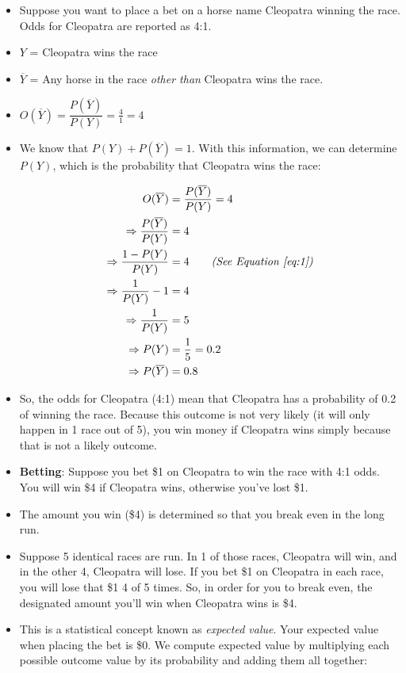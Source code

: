 \documentclass[]{book}
\providecommand{\tightlist}{%
  \setlength{\itemsep}{0pt}\setlength{\parskip}{0pt}}
\theoremstyle{definition}
\theoremstyle{definition}
\theoremstyle{remark}
\begin{document}
\begin{itemize}
\tightlist
\item
  Suppose you want to place a bet on a horse name Cleopatra winning the
  race. Odds for Cleopatra are reported as 4:1.
\item
  \(Y\) = Cleopatra wins the race
\item
  \(\overline{Y}\) = Any horse in the race \emph{other than} Cleopatra
  wins the race.
\item
  \(O(\overline{Y}) = \dfrac{P(\overline{Y})}{P(Y)} = \frac{4}{1} = 4\)
\item
  We know that \(P(Y) + P(\overline{Y})=1\). With this information, we
  can determine \(P(Y)\), which is the probability that Cleopatra wins
  the race:

  \begin{align*}
  O(\overline{Y}) & = \dfrac{P(\overline{Y})}{P(Y)} = 4 \\
  \Rightarrow  \dfrac{P(\overline{Y})}{P(Y)} & = 4 \\ \Rightarrow  \dfrac{1 - P(Y)}{P(Y)} & = 4 \quad \quad \textit{(See Equation \ref{eq:1})} \\ 
  \Rightarrow \dfrac{1}{P(Y)} - 1 & = 4 \\
  \Rightarrow \dfrac{1}{P(Y)} & = 5 \\
  \Rightarrow P(Y) & = \frac{1}{5} = 0.2 \\
  \Rightarrow P(\overline{Y}) & = 0.8
  \end{align*}
\item
  So, the odds for Cleopatra (4:1) mean that Cleopatra has a probability
  of 0.2 of winning the race. Because this outcome is not very likely
  (it will only happen in 1 race out of 5), you win money if Cleopatra
  wins simply because that is not a likely outcome.
\item
  \textbf{Betting}: Suppose you bet \$1 on Cleopatra to win the race
  with 4:1 odds. You will win \$4 if Cleopatra wins, otherwise you've
  lost \$1.
\item
  The amount you win (\$4) is determined so that you break even in the
  long run.
\item
  Suppose 5 identical races are run. In 1 of those races, Cleopatra will
  win, and in the other 4, Cleopatra will lose. If you bet \$1 on
  Cleopatra in each race, you will lose that \$1 4 of 5 times. So, in
  order for you to break even, the designated amount you'll win when
  Cleopatra wins is \$4.
\item
  This is a statistical concept known as \emph{expected value}. Your
  expected value when placing the bet is \$0. We compute expected value
  by multiplying each possible outcome value by its probability and
  adding them all together:


\end{itemize}
\end{document}
